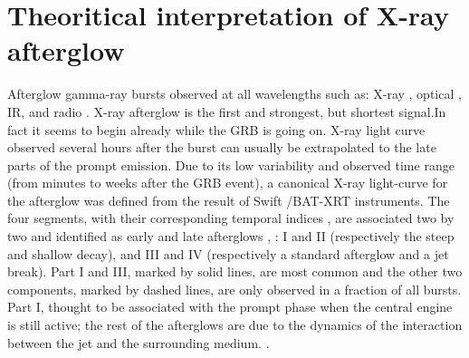 \section{Theoritical interpretation of X-ray afterglow}
Afterglow gamma-ray bursts  observed at all wavelengths such as: X-ray \citep{26}, optical \citep{27}, IR, and radio \citep{28}. X-ray afterglow is the first and strongest, but shortest signal.In fact it seems to begin already while the GRB is going on. X-ray light curve observed several hours after the burst can usually be extrapolated to the late parts of the prompt emission. Due to  its low variability and observed time range (from minutes to weeks after the GRB event), a canonical X-ray light-curve for the afterglow was defined from the result of Swift /BAT-XRT instruments. The four segments, with their corresponding temporal indices , are associated two by two and identified as early and late afterglows \citep{29},\citep{30}\citep{31} : I and II (respectively the steep and shallow decay), and III and IV (respectively a standard afterglow and a jet break). Part I and III, marked by solid lines, are most common and the other two components, marked by dashed lines, are only observed in a fraction of all bursts. Part I, thought to be associated with the prompt phase  when the central engine is still active; the rest of the afterglows are due to the dynamics of the interaction between the jet and the surrounding medium.\citep{6}\cite {15}\citep{18} \citep{32}.\\\\

